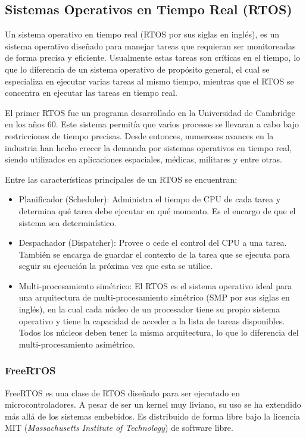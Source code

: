 \subsection{Sistemas Operativos en Tiempo Real (RTOS)} 
\label{subsec:rtossubsec}

Un sistema operativo en tiempo real (RTOS por sus siglas en inglés), es un sistema operativo diseñado para manejar tareas que requieran ser monitoreadas de forma precisa y eficiente. Usualmente estas tareas son críticas en el tiempo, lo que lo diferencia de un sistema operativo de propósito general, el cual se especializa en ejecutar varias tareas al mismo tiempo, mientras que el RTOS se concentra en ejecutar las tareas en tiempo real.

El primer RTOS fue un programa desarrollado en la Universidad de Cambridge en los años 60. Este sistema permitía que varios procesos se llevaran a cabo bajo restricciones de tiempo precisas. Desde entonces, numerosos avances en la industria han hecho crecer la demanda por sistemas operativos en tiempo real, siendo utilizados en aplicaciones espaciales, médicas, militares y entre otras.

Entre las características principales de un RTOS se encuentran:

\begin{itemize}
    \item Planificador (Scheduler): Administra el tiempo de CPU de cada tarea y determina qué tarea debe ejecutar en qué momento. Es el encargo de que el sistema sea determinístico.
    \item Despachador (Dispatcher): Provee o cede el control del CPU a una tarea. También se encarga de guardar el contexto de la tarea que se ejecuta para seguir su ejecución la próxima vez que esta se utilice.
    \item Multi-procesamiento simétrico: El RTOS es el sistema operativo ideal para una arquitectura de multi-procesamiento simétrico (SMP por sus siglas en inglés), en la cual cada núcleo de un procesador tiene su propio sistema operativo y tiene la capacidad de acceder a la lista de tareas disponibles. Todos los núcleos deben tener la misma arquitectura, lo que lo diferencia del multi-procesamiento asimétrico.
\end{itemize}

\subsubsection{FreeRTOS} FreeRTOS es una clase de RTOS diseñado para ser ejecutado en microcontroladores. A pesar de ser un kernel muy liviano, su uso se ha extendido más allá de los sistemas embebidos. Es distribuido de forma libre bajo la licencia MIT (\textit{Massachusetts Institute of Technology}) de software libre.

